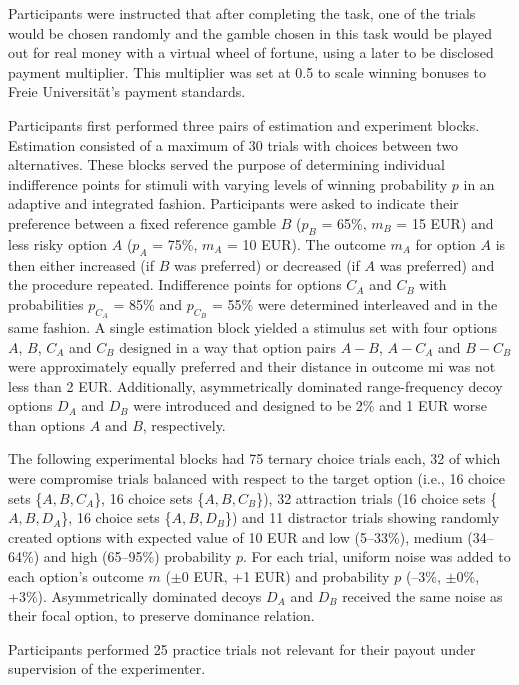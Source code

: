 \documentclass[11pt, a4paper]{article}
\begin{document}
Participants were instructed that after completing the task, one of the trials would be chosen randomly and the gamble chosen in this task would be played out for real money with a virtual wheel of fortune, using a later to be disclosed payment multiplier. This multiplier was set at 0.5 to scale winning bonuses to Freie Universität’s payment standards.

Participants first performed three pairs of estimation and experiment blocks. Estimation consisted of a maximum of 30 trials with choices between two alternatives. These blocks served the purpose of determining individual indifference points for stimuli with varying levels of winning probability $p$ in an adaptive and integrated fashion. Participants were asked to indicate their preference between a fixed reference gamble $B$ ($p_B$ = 65\%, $m_B$ = 15 EUR) and less risky option $A$ ($p_A$ = 75\%, $m_A$ = 10 EUR). The outcome $m_A$ for option $A$ is then either increased (if $B$ was preferred) or decreased (if $A$ was preferred) and the procedure repeated. Indifference points for options $C_A$ and $C_B$ with probabilities $p_{C_A}$ = 85\% and $p_{C_B}$ = 55\% were determined interleaved and in the same fashion. A single estimation block yielded a stimulus set with four options $A$, $B$, $C_A$ and $C_B$ designed in a way that option pairs $A-B$, $A-C_A$ and $B-C_B$ were approximately equally preferred and their distance in outcome mi was not less than 2 EUR. Additionally, asymmetrically dominated range-frequency decoy options $D_A$ and $D_B$ were introduced and designed to be 2\% and 1 EUR worse than options $A$ and $B$, respectively.

The following experimental blocks had 75 ternary choice trials each, 32 of which were compromise trials balanced with respect to the target option (i.e., 16 choice sets \{$A,B,C_A$\}, 16 choice sets \{$A,B,C_B$\}), 32 attraction trials (16 choice sets \{$A,B,D_A$\}, 16 choice sets \{$A,B,D_B$\}) and 11 distractor trials showing randomly created options with expected value of 10 EUR and low (5–33\%), medium (34–64\%) and high (65–95\%) probability $p$. For each trial, uniform noise was added to each option’s outcome $m$ ($\pm$0 EUR, +1 EUR) and probability $p$ (–3\%, $\pm$0\%, +3\%). Asymmetrically dominated decoys $D_A$ and $D_B$ received the same noise as their focal option, to preserve dominance relation.

Participants performed 25 practice trials not relevant for their payout under supervision of the experimenter.
\end{document}
